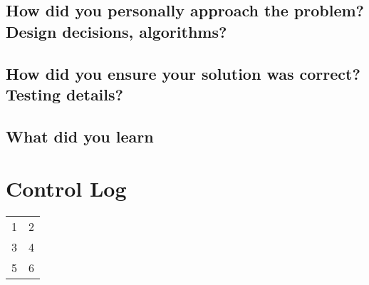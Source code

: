 \documentclass[onecolumn, draftclsnofoot, 10pt, titlepage, compsoc]{IEEEtran}
\begin{document}
\subsection*{How did you personally approach the problem? Design decisions, algorithms?}
\subsection*{How did you ensure your solution was correct? Testing details?}
\subsection*{What did you learn}

\section*{Control Log}
\begin{center}
	\begin{tabular}{ c c }
		1 & 2 \\
		3 & 4 \\
		5 & 6
	\end{tabular}
\end{center}

\nocite{*}


\end{document}

